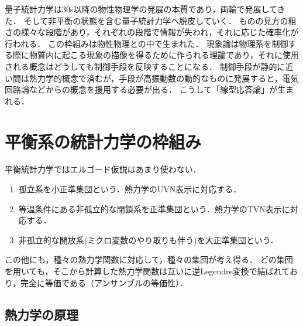 \documentclass[uplatex,dvipdfmx]{jsreport}
\begin{document}
\begin{history}[統計物理学の歩み]
    量子統計力学は30s以降の物性物理学の発展の本質であり，両輪で発展してきた．
    そして非平衡の状態を含む量子統計力学へ脱皮していく．
    ものの見方の粗さの様々な段階があり，それぞれの段階で情報が失われ，それに応じた確率化が行われる．
    この枠組みは物性物理との中で生まれた．
    現象論は物理系を制御する際に物質内に起こる現象の描像を得るために作られる理論であり，それに使用される概念はどうしても制御手段を反映することになる．
    制御手段が静的に近い間は熱力学的概念で済むが，手段が高振動数の動的なものに発展すると，電気回路論などからの概念を援用する必要が出る．
    こうして「線型応答論」が生まれる．
\end{history}

\section{平衡系の統計力学の枠組み}

\begin{tcolorbox}[colframe=ForestGreen, colback=ForestGreen!10!white,breakable,colbacktitle=ForestGreen!40!white,coltitle=black,fonttitle=\bfseries\sffamily,
title=]
    平衡統計力学ではエルゴード仮説はあまり使わない．
    \begin{enumerate}
        \item 孤立系を小正準集団という．熱力学のUVN表示に対応する．
        \item 等温条件にある非孤立的な閉鎖系を正準集団という．熱力学のTVN表示に対応する．
        \item 非孤立的な開放系(ミクロ変数のやり取りも伴う)を大正準集団という．
    \end{enumerate}
    この他にも，種々の熱力学関数に対応して，種々の集団が考え得る．
    どの集団を用いても，そこから計算した熱力学関数は互いに逆Legendre変換で結ばれており，完全に等価である（アンサンブルの等価性）．
\end{tcolorbox}

\subsection{熱力学の原理}
\end{document}
